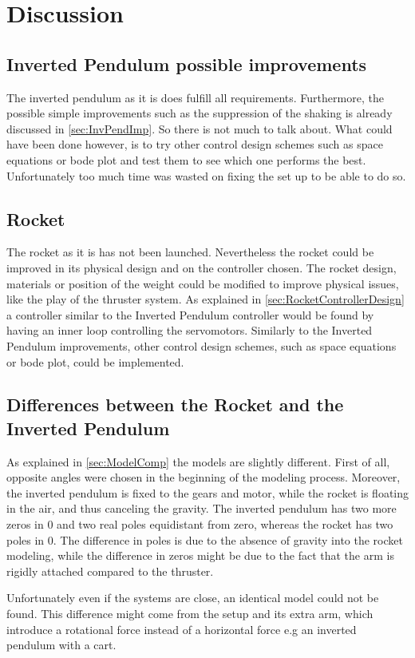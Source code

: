 \chapter{Discussion}\label{sec:Discussion}

\section{Inverted Pendulum possible improvements}

The inverted pendulum as it is does fulfill all requirements. Furthermore, the possible simple improvements such as the suppression of the shaking is already discussed in \autoref{sec:InvPendImp}. So there is not much to talk about. What could have been done however, is to try other control design schemes such as space equations or bode plot and test them to see which one performs the best. Unfortunately too much time was wasted on fixing the set up to be able to do so.

\section{Rocket}

The rocket as it is has not been launched. Nevertheless the rocket could be improved in its physical design and on the controller chosen. The rocket design, materials or position of the weight could be modified to improve physical issues, like the play of the thruster system. As explained in \autoref{sec:RocketControllerDesign} a controller similar to the Inverted Pendulum controller would be found by having an inner loop controlling the servomotors. Similarly to the Inverted Pendulum improvements, other control design schemes, such as space equations or bode plot, could be implemented.

\section{Differences between the Rocket and the Inverted Pendulum}

As explained in \autoref{sec:ModelComp} the models are slightly different. First of all, opposite angles were chosen in the beginning of the modeling process. Moreover, the inverted pendulum is fixed to the gears and motor, while the rocket is floating in the air, and thus canceling the gravity. The inverted pendulum has two more zeros in 0 and two real poles equidistant from zero, whereas the rocket has two poles in 0. The difference in poles is due to the absence of gravity into the rocket modeling, while the difference in zeros might be due to the fact that the arm is rigidly attached compared to the thruster.

Unfortunately even if the systems are close, an identical model could not be found. This difference might come from the setup and its extra arm, which introduce a rotational force instead of a horizontal force e.g an inverted pendulum with a cart.